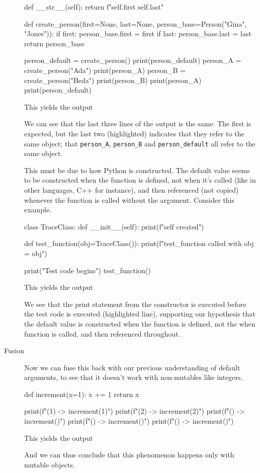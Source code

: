 \begin{description}
\begin{pyblock}[default1][highlightlines={10-12}]
  def __str__(self):
    return f"{self.first} {self.last}"

def create_person(first=None, last=None,
                  person_base=Person("Gina", "Jones")):
  if first: person_base.first = first
  if last: person_base.last = last
  return person_base

person_default = create_person()
print(person_default)
person_A = create_person("Ada")
print(person_A)
person_B = create_person("Beda")
print(person_B)
print(person_A)
print(person_default)
    \end{pyblock}
    This yields the output
    \printpythontex[verbatim][highlightlines={4-5}]

    We can see that the last three lines of the output is the same.
    The first is expected, but the last two (highlighted) indicates that they 
    refer to the same object; \ie that \texttt{person_A}, 
    \texttt{person_B} and \texttt{person_default} all 
    refer to the same object.

    This must be due to how Python is constructed.
    The default value seems to be constructed when the function is defined, not 
    when it's called (like in other languages, C++ for instance), and then 
    referenced (not copied) whenever the function is called without the 
    argument.
    Consider this example.

    \begin{pyblock}[default1][highlightlines=5]
class TraceClass:
  def __init__(self):
    print(f"{self} created")

def test_function(obj=TraceClass()):
  print(f"test_function called with obj = {obj}")

print("Test code begins")
test_function()
    \end{pyblock}
    This yields the output
    \printpythontex[verbatim][highlightlines={1}]

    We see that the print statement from the constructor is executed before the 
    test code is executed (highlighted line), supporting our hypothesis that 
    the default value is constructed when the function is defined, not the when 
    function is called, and then referenced throughout.

  \item[Fusion] Now we can fuse this back with our previous understanding of 
    default arguments, to see that it doesn't work with non-mutables like 
    integers.
    \begin{pyblock}[default1]
def increment(x=1):
  x += 1
  return x

print(f"(1) -> {increment(1)}")
print(f"(2) -> {increment(2)}")
print(f"()  -> {increment()}")
print(f"()  -> {increment()}")
print(f"()  -> {increment()}")
    \end{pyblock}
    This yields the output
    \printpythontex[verbatim][highlightlines={3-5}]

    And we can thus conclude that this phenomenon happens only with mutable 
    objects.
\end{description}

